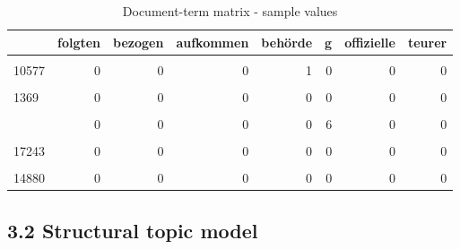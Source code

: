 \documentclass[
  12pt,
]{article}
\begin{document}
\begin{table}[H]

\caption{\label{tab:Document term matrix}Document-term matrix - sample values \label{table:dtm}}
\centering
\fontsize{7}{9}\selectfont
\begin{tabular}[t]{lrrrrrrr}
\toprule
  & folgten & bezogen & aufkommen & behörde & g & offizielle & teurer\\
\midrule
\cellcolor{gray!6}{15499} & \cellcolor{gray!6}{0} & \cellcolor{gray!6}{0} & \cellcolor{gray!6}{0} & \cellcolor{gray!6}{0} & \cellcolor{gray!6}{0} & \cellcolor{gray!6}{0} & \cellcolor{gray!6}{0}\\
10577 & 0 & 0 & 0 & 1 & 0 & 0 & 0\\
\cellcolor{gray!6}{11112} & \cellcolor{gray!6}{0} & \cellcolor{gray!6}{0} & \cellcolor{gray!6}{0} & \cellcolor{gray!6}{0} & \cellcolor{gray!6}{0} & \cellcolor{gray!6}{0} & \cellcolor{gray!6}{0}\\
1369 & 0 & 0 & 0 & 0 & 0 & 0 & 0\\
\cellcolor{gray!6}{3116} & \cellcolor{gray!6}{0} & \cellcolor{gray!6}{0} & \cellcolor{gray!6}{0} & \cellcolor{gray!6}{0} & \cellcolor{gray!6}{14} & \cellcolor{gray!6}{1} & \cellcolor{gray!6}{0}\\
\addlinespace
7710 & 0 & 0 & 0 & 0 & 6 & 0 & 0\\
\cellcolor{gray!6}{2895} & \cellcolor{gray!6}{0} & \cellcolor{gray!6}{0} & \cellcolor{gray!6}{0} & \cellcolor{gray!6}{0} & \cellcolor{gray!6}{0} & \cellcolor{gray!6}{0} & \cellcolor{gray!6}{0}\\
17243 & 0 & 0 & 0 & 0 & 0 & 0 & 0\\
\cellcolor{gray!6}{323} & \cellcolor{gray!6}{0} & \cellcolor{gray!6}{0} & \cellcolor{gray!6}{0} & \cellcolor{gray!6}{0} & \cellcolor{gray!6}{0} & \cellcolor{gray!6}{0} & \cellcolor{gray!6}{0}\\
14880 & 0 & 0 & 0 & 0 & 0 & 0 & 0\\
\bottomrule
\end{tabular}
\end{table}

\hypertarget{structural-topic-model}{%
\subsection{3.2 Structural topic model}\label{structural-topic-model}}
\end{document}
